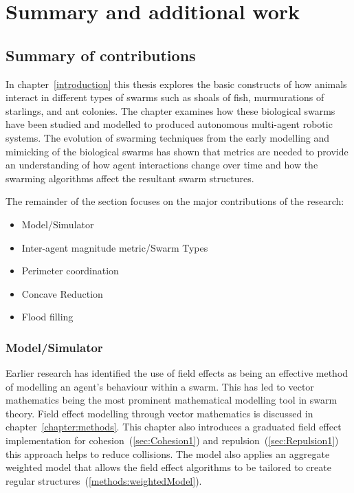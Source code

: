 \chapter{Summary and additional work}\label{Future}
\section{Summary of contributions}
In chapter~\ref{introduction} this thesis explores the basic constructs of how animals interact in different types of swarms such as shoals of fish, murmurations of starlings, and ant colonies. The chapter examines how these biological swarms have been studied and modelled to produced autonomous multi-agent robotic systems. The evolution of swarming techniques from the early modelling and mimicking of the biological swarms has shown that metrics are needed to provide an understanding of how agent interactions change over time and how the swarming algorithms affect the resultant swarm structures.

The remainder of the section focuses on the major contributions of the research:

\begin{itemize}
\item Model/Simulator
\item Inter-agent magnitude metric/Swarm Types
\item Perimeter coordination
\item Concave Reduction
\item Flood filling
\end{itemize}

\subsection{Model/Simulator}
Earlier research has identified the use of field effects as being an effective method of modelling an agent's behaviour within a swarm. This has led to vector mathematics being the most prominent mathematical modelling tool in swarm theory. Field effect modelling through vector mathematics is discussed in chapter~\ref{chapter:methods}. This chapter also introduces a graduated field effect implementation for cohesion~(\autoref{sec:Cohesion1}) and repulsion~(\autoref{sec:Repulsion1}) this approach helps to reduce collisions. The model also applies an aggregate weighted model that allows the field effect algorithms to be tailored to create regular structures~(\autoref{methods:weightedModel}).

